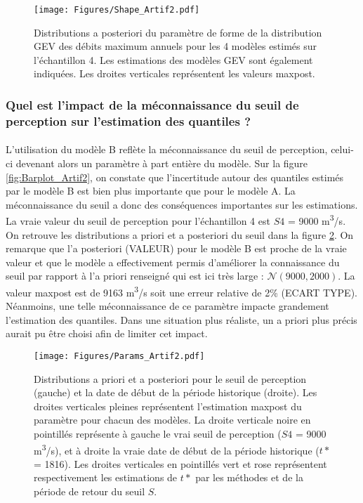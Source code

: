 \documentclass[11pt]{article}
\begin{document}
	\begin{figure}[h]
		\centering
		\texttt{[image: Figures/Shape\_Artif2.pdf]}	
		\caption{Distributions a posteriori du paramètre de forme de la distribution GEV des débits maximum annuels pour les 4 modèles estimés sur l'échantillon 4. Les estimations des modèles GEV sont également indiquées. Les droites verticales représentent les valeurs maxpost.}
		\label{fig:Shape_Artif2}
	\end{figure}

\FloatBarrier
	
	\subsubsection{Quel est l'impact de la méconnaissance du seuil de perception sur l'estimation des quantiles ?}
	
	\paragraph{} L'utilisation du modèle B reflète la méconnaissance du seuil de perception, celui-ci devenant alors un paramètre à part entière du modèle. Sur la figure \ref{fig:Barplot_Artif2}, on constate que l'incertitude autour des quantiles estimés par le modèle B est bien plus importante que pour le modèle A. La méconnaissance du seuil a donc des conséquences importantes sur les estimations. La vraie valeur du seuil de perception pour l'échantillon 4 est $S4$ = 9000 m\textsuperscript{3}/s. On retrouve les distributions a priori et a posteriori du seuil dans la figure \ref{fig:Params_Artif2}. On remarque que l'a posteriori (VALEUR) pour le modèle B est proche de la vraie valeur et que le modèle a effectivement permis d'améliorer la connaissance du seuil par rapport à l'a priori renseigné qui est ici très large : $\mathcal{N}(9000,2000)$. La valeur maxpost est de 9163 m\textsuperscript{3}/s soit une erreur relative de 2\% (ECART TYPE). Néanmoins, une telle méconnaissance de ce paramètre impacte grandement l'estimation des quantiles. Dans une situation plus réaliste, un a priori plus précis aurait pu être choisi afin de limiter cet impact. 
	
	 \begin{figure}[h]
		\centering
		\texttt{[image: Figures/Params\_Artif2.pdf]}	
		\caption{Distributions a priori et a posteriori pour le seuil de perception (gauche) et la date de début de la période historique (droite). Les droites verticales pleines représentent l'estimation maxpost du paramètre pour chacun des modèles. La droite verticale noire en pointillés représente à gauche le vrai seuil de perception ($S4$ = 9000 m\textsuperscript{3}/s), et à droite la vraie date de début de la période historique ($t*$ = 1816). Les droites verticales en pointillés vert et rose représentent respectivement les estimations de $t*$ par les méthodes \cite{prosdocimi_german_2018} et de la période de retour du seuil $S$.}
		\label{fig:Params_Artif2}
	\end{figure}
	
\end{document}
